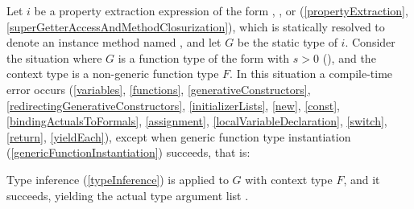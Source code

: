 \documentclass[makeidx]{article}
\begin{document}
{\LMHash{}%
Let $i$ be a property extraction expression of the form
, , or 
(\ref{propertyExtraction}, \ref{superGetterAccessAndMethodClosurization}),
which is statically resolved to denote an instance method named \id,
and let $G$ be the static type of $i$.
Consider the situation where $G$ is a function type of the form
with $s > 0$
(),
and the context type is a non-generic function type $F$.
In this situation a compile-time error occurs
(\ref{variables},
\ref{functions},
\ref{generativeConstructors},
\ref{redirectingGenerativeConstructors},
\ref{initializerLists},
\ref{new},
\ref{const},
\ref{bindingActualsToFormals},
\ref{assignment},
\ref{localVariableDeclaration},
\ref{switch},
\ref{return},
\ref{yieldEach}),
except when generic function type instantiation
(\ref{genericFunctionInstantiation})
succeeds, that is:

\LMHash{}%
Type inference
(\ref{typeInference})
is applied to $G$ with context type $F$,
and it succeeds, yielding the actual type argument list
.

{ %

\def\gmiName{\metavar{gmiName\ensuremath{_{\id}}}}

}}
\end{document}

